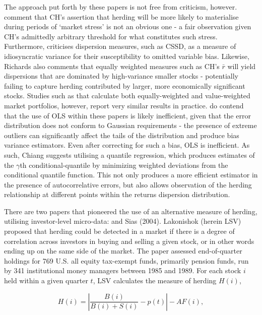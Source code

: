 \documentclass[12pt]{article}
\numberwithin{table}{section}   %
\begin{document}
The approach put forth by these papers is not free from criticism, however. \citet{hirshleifer_review} comment that CH’s assertion that herding will be more likely to materialise during periods of ‘market stress’ is not an obvious one - a fair observation given CH’s admittedly arbitrary threshold for what constitutes such stress. Furthermore, \citet{richards} criticises dispersion measures, such as CSSD, as a measure of idiosyncratic variance for their susceptibility to omitted variable bias. Likewise, Richards also comments that equally weighted measures such as CH’s $\bar{r}$ will yield dispersions that are dominated by high-variance smaller stocks - potentially failing to capture herding contributed by larger, more economically significant stocks. Studies such as \citet{chiang} that calculate both equally-weighted and value-weighted market portfolios, however, report very similar results in practice. \citet{chiang} do contend that the use of OLS within these papers is likely inefficient, given that the error distribution does not conform to Gaussian requirements - the presence of extreme outliers can significantly affect the tails of the distribution and produce bias variance estimators. Even after correcting for such a bias, OLS is inefficient. As such, Chiang suggests utilising a quantile regression, which produces estimates of the $\gamma$th conditional-quantile by minimizing weighted deviations from the conditional quantile function. This not only produces a more efficient estimator in the presence of autocorrelative errors, but also allows observation of the herding relationship at different points within the returns dispersion distribution.

There are two papers that pioneered the use of an alternative measure of herding, utilising investor-level micro-data: \citet{lakonishok} and Sias (2004). Lakonishok (herein LSV) proposed that herding could be detected in a market if there is a degree of correlation across investors in buying and selling a given stock, or in other words ending up on the same side of the market. The paper assessed end-of-quarter holdings for 769 U.S. all equity tax-exempt funds, primarily pension funds, run by 341 institutional money managers between 1985 and 1989. For each stock $i$ held within a given quarter $t$, LSV calculates the measure of herding $H(i)$,

$$
H(i)=|\frac{B(i)}{B(i)+S(i)}-p(t)|-AF(i),
$$
\end{document}
